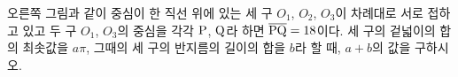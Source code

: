 \noindent\begin{minipage}[t]{0.58\linewidth}\vspace{0pt}\raggedright 오른쪽 그림과 같이 중심이 한 직선 위에 있는 세 구 $O_1$, $O_2$, $O_3$이 차례대로 서로 접하고 있고 두 구 $O_1$, $O_3$의 중심을 각각 $\mathrm{P}$, $\mathrm{Q}$라 하면 $\overline{\mathrm{PQ}}=18$이다. 세 구의 겉넓이의 합의 최솟값을 $a\pi$, 그때의 세 구의 반지름의 길이의 합을 $b$라 할 때, $a+b$의 값을 구하시오.\end{minipage}\hfill\begin{minipage}[t]{0.4\linewidth}\vspace{0pt}\centering \resizebox{\ifdim\width>\linewidth\linewidth\else\width\fi}{!}{}\end{minipage}\par
